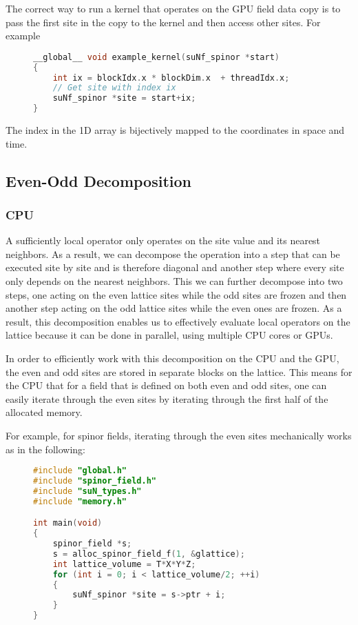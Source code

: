 \documentclass[12pt]{article}
\begin{document}
The correct way to run a kernel that operates on the GPU field data copy is to pass the first site in the copy to the kernel and then access other sites. For example

\begin{figure}[H]
\begin{lstlisting}[caption=Example for kernel,language=C]
__global__ void example_kernel(suNf_spinor *start) 
{
    int ix = blockIdx.x * blockDim.x  + threadIdx.x;
    // Get site with index ix
    suNf_spinor *site = start+ix;
}
\end{lstlisting}
\end{figure}

The index in the 1D array is bijectively mapped to the coordinates in space and time.

\subsection*{Even-Odd Decomposition}
\subsubsection*{CPU}
A sufficiently local operator only operates on the site value and its nearest neighbors. %
As a result, we can decompose the operation into a step that can be executed site by site and is therefore diagonal and another step where every site only depends on the nearest neighbors. This we can further decompose into two steps, one acting on the even lattice sites while the odd sites are frozen and then another step acting on the odd lattice sites while the even ones are frozen. As a result, this decomposition enables us to effectively evaluate local operators on the lattice because it can be done in parallel, using multiple CPU cores or GPUs. \par
In order to efficiently work with this decomposition on the CPU and the GPU, the even and odd sites are stored in separate blocks on the lattice. This means for the CPU that for a field that is defined on both even and odd sites, one can easily iterate through the even sites by iterating through the first half of the allocated memory. 

For example, for spinor fields, iterating through the even sites mechanically works as in the following:
\begin{figure}[H]
\begin{lstlisting}[caption=CPU Iterate through even sites,language=C]
#include "global.h"
#include "spinor_field.h"
#include "suN_types.h"
#include "memory.h"

int main(void) 
{
    spinor_field *s;
    s = alloc_spinor_field_f(1, &glattice);
    int lattice_volume = T*X*Y*Z; 
    for (int i = 0; i < lattice_volume/2; ++i) 
    {
        suNf_spinor *site = s->ptr + i;
    }
}
\end{lstlisting}
\end{figure}
\end{document}
